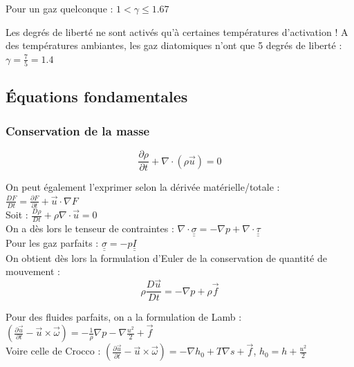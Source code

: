 \documentclass[../main.tex]{subfiles}
\begin{document}
\warning Pour un gaz quelconque : $1<\gamma \leq1.67$

Les degrés de liberté ne sont activés qu'à certaines températures d'activation ! A des températures ambiantes, les gaz diatomiques n'ont que 5 degrés de liberté : $\gamma = \frac{7}{5} = 1.4$\\

\subsection{Équations fondamentales}

\subsubsection{Conservation de la masse}

\begin{equation}
    \frac{\partial \rho}{\partial t} + \nabla \cdot (\rho \Vec{u}) = 0
\end{equation}

On peut également l'exprimer selon la dérivée matérielle/totale : $\frac{DF}{Dt} = \frac{\partial F}{\partial t} + \Vec{u}\cdot \nabla F$\\

Soit : $\frac{D \rho}{Dt} + \rho \nabla \cdot \Vec{u} = 0$\\

On a dès lors le tenseur de contraintes : $\nabla \cdot \underline{\underline{\sigma}} = -\nabla p + \nabla \cdot \underline{\underline{\tau}}$\\

Pour les gaz parfaits : $\underline{\underline{\sigma}} = -p \underline{\underline{I}}$\\

On obtient dès lors la formulation d'Euler de la conservation de quantité de mouvement : \begin{equation}
    \rho \frac{D \Vec{u}}{Dt} = -\nabla p + \rho \Vec{f}
\end{equation}

Pour des fluides parfaits, on a la formulation de Lamb : $(\frac{\partial \Vec{u}}{\partial t} - \Vec{u} \times \Vec{\omega}) = -\frac{1}{\rho} \nabla p - \nabla \frac{u^2}{2} + \Vec{f}$\\

Voire celle de Crocco : $(\frac{\partial \Vec{u}}{\partial t} - \Vec{u} \times \Vec{\omega}) = -\nabla h_0 + T\nabla s + \Vec{f}$, $h_0 = h + \frac{u^2}{2}$\\
\end{document}
